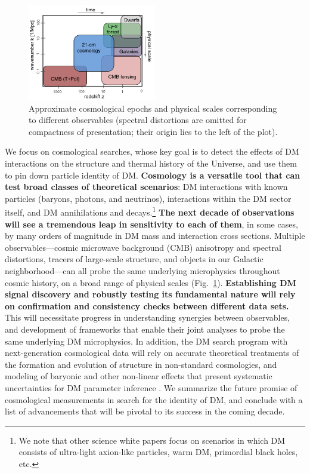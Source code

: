\documentclass[12pt]{article}
\begin{document}
\begin{figure}
\begin{center}
\vspace{-0.9cm}
\includegraphics[width=0.5\textwidth]{scales.png}
\end{center}
\vspace{-0.8cm}
\caption{Approximate cosmological epochs and physical scales corresponding to different observables (spectral distortions are omitted for compactness of presentation; their origin lies to the left of the plot).}
\vspace{-0.2cm}
\label{fig:scales}
\end{figure}
We focus on cosmological searches, whose key goal is to detect the effects of DM interactions on the structure and thermal history of the Universe, and use them to pin down particle identity of DM.
\textbf{Cosmology is a versatile tool that can test broad classes of theoretical scenarios}: DM interactions with known particles (baryons, photons, and neutrinos), interactions within the DM sector itself, and DM annihilations and decays.\footnote{We note that other science white papers focus on scenarios in which DM consists of ultra-light axion-like particles, warm DM, primordial black holes, etc.}
\textbf{The next decade of observations will see a tremendous leap in sensitivity to each of them}, in some cases, by many orders of magnitude in DM mass and interaction cross sections.
Multiple observables---cosmic microwave background (CMB) anisotropy and spectral distortions, tracers of large-scale structure, and objects in our Galactic neighborhood---can all probe the same underlying microphysics throughout cosmic history, on a broad range of physical scales (Fig.~\ref{fig:scales}).
\textbf{Establishing DM signal discovery and robustly testing its fundamental nature will rely on confirmation and consistency checks between different data sets.}
This will necessitate progress in understanding synergies between observables, and development of frameworks that enable their joint analyses to probe the same underlying DM microphysics.
In addition, the DM search program with next-generation cosmological data will rely on accurate theoretical treatments of the formation and evolution of structure in non-standard cosmologies, and modeling of baryonic and other non-linear effects that present systematic uncertainties for DM parameter inference \cite{2019arXiv190201055D,2018PhRvD..98h3540M,AliHaimoud_19}.
We summarize the future promise of cosmological measurements in search for the identity of DM, and conclude with a list of advancements that will be pivotal to its success in the coming decade.
\vspace{-0.4cm}
\end{document}
